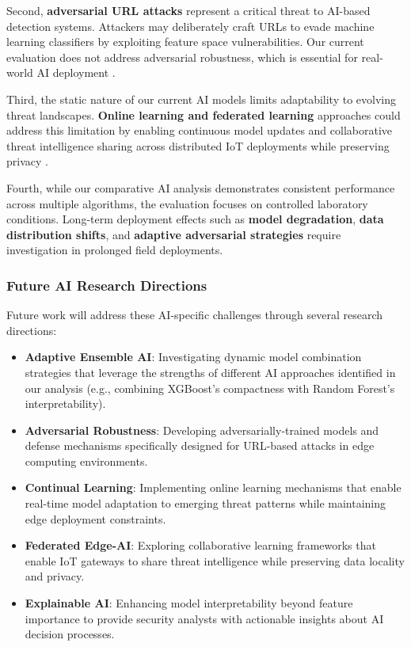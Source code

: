 \documentclass[conference]{IEEEtran}
\begin{document}
Second, \textbf{adversarial URL attacks} represent a critical threat to AI-based detection systems. Attackers may deliberately craft URLs to evade machine learning classifiers by exploiting feature space vulnerabilities. Our current evaluation does not address adversarial robustness, which is essential for real-world AI deployment \cite{ref_adversarial_ml}.

Third, the static nature of our current AI models limits adaptability to evolving threat landscapes. \textbf{Online learning and federated learning} approaches could address this limitation by enabling continuous model updates and collaborative threat intelligence sharing across distributed IoT deployments while preserving privacy \cite{ref_federated_learning,ref_online_learning}.

Fourth, while our comparative AI analysis demonstrates consistent performance across multiple algorithms, the evaluation focuses on controlled laboratory conditions. Long-term deployment effects such as \textbf{model degradation}, \textbf{data distribution shifts}, and \textbf{adaptive adversarial strategies} require investigation in prolonged field deployments.

\subsubsection{Future AI Research Directions}

Future work will address these AI-specific challenges through several research directions:

\begin{itemize}
\item \textbf{Adaptive Ensemble AI}: Investigating dynamic model combination strategies that leverage the strengths of different AI approaches identified in our analysis (e.g., combining XGBoost's compactness with Random Forest's interpretability).

\item \textbf{Adversarial Robustness}: Developing adversarially-trained models and defense mechanisms specifically designed for URL-based attacks in edge computing environments.

\item \textbf{Continual Learning}: Implementing online learning mechanisms that enable real-time model adaptation to emerging threat patterns while maintaining edge deployment constraints.

\item \textbf{Federated Edge-AI}: Exploring collaborative learning frameworks that enable IoT gateways to share threat intelligence while preserving data locality and privacy.

\item \textbf{Explainable AI}: Enhancing model interpretability beyond feature importance to provide security analysts with actionable insights about AI decision processes.
\end{itemize}
\end{document}
